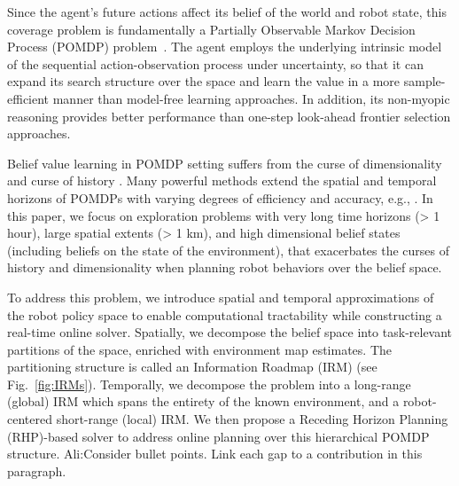 \documentclass[letterpaper]{article} %
\newcommand{\phdone}[1]{} %
\newcommand{\acomm}[1]{{\color{cyan}Ali:#1}} %
\begin{document}
\phdone{Problem description--POMDP perspective}
Since the agent's future actions affect its belief of the world and robot state, this coverage problem is fundamentally a Partially Observable Markov Decision Process (POMDP) problem~\cite{pomdps_monahan1982}.
The agent employs the underlying intrinsic model of the sequential action-observation process under uncertainty, so that it can %
expand its search structure over the space and learn the value in a more sample-efficient manner than model-free learning approaches.
In addition, its non-myopic reasoning provides better performance than one-step look-ahead frontier selection approaches.

\phdone{Gap in the state-of-the-art}
Belief value learning in POMDP setting suffers from the curse of dimensionality \cite{KLC98} and curse of history \cite{Pineau03}. Many powerful methods extend the spatial and temporal horizons of POMDPs with varying degrees of efficiency and accuracy, e.g., \cite{silver2010monte,somani2013despot,bonet1998learning,kim2019pomhdp}. In this paper, we focus on exploration problems with very long time horizons (> 1 hour), large spatial extents (> 1 km), and high dimensional belief states (including beliefs on the state of the environment), that exacerbates the curses of history and dimensionality when planning robot behaviors over the belief space.
%

\phdone{Contributions}
To address this problem, we introduce spatial and temporal approximations of the robot policy space to enable computational tractability while constructing a real-time online solver.
Spatially, we decompose the belief space into task-relevant partitions of the space,
enriched with environment map estimates. %
The partitioning structure is called an Information Roadmap (IRM) (see Fig.~\ref{fig:IRMs}). Temporally, we decompose the problem into a long-range (global) IRM which spans the entirety of the known environment, and a robot-centered short-range (local) IRM. %
We then propose a Receding Horizon Planning (RHP)-based solver to address online planning over this hierarchical POMDP structure.
\acomm{Consider bullet points. Link each gap to a contribution in this paragraph.}
\end{document}
